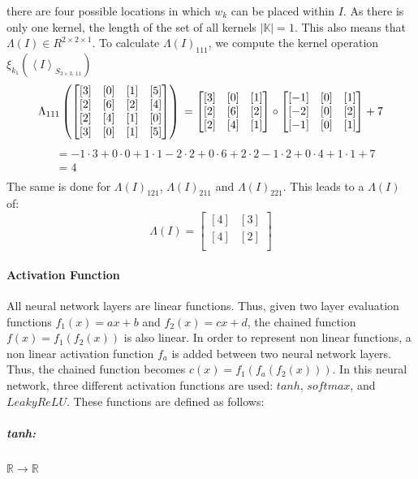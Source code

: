 \documentclass[12pt]{article}
\begin{document}
there are four possible locations in which \(w_k\) can be placed within \(I\). As there is only one kernel, the length of the set of all kernels \(|\mathbb{K}| = 1\). This also means that \(\Lambda(I) \in R^{2 \times 2 \times 1}\). To calculate \(\Lambda(I)_{111}\), we compute the kernel operation \(\xi_{k_1}(\left<I\right>_{S_{3\times 3,\,11}})\)
\begin{equation}
\label{eq:conv:eg}
\Lambda_{111}
\left(\begin{bmatrix}
[3] & [0] & [1] & [5] \\
[2] & [6] & [2] & [4] \\
[2] & [4] & [1] & [0] \\
[3] & [0] & [1] & [5] \\
\end{bmatrix}\right)\\
 = \begin{bmatrix}
[3] & [0] & [1] \\
[2] & [6] & [2] \\
[2] & [4] & [1] \\
\end{bmatrix} \circ 
\begin{bmatrix}
[-1] & [0] & [1] \\
[-2] & [0] & [2] \\
[-1] & [0] & [1]
\end{bmatrix} + 7
\end{equation}
\begin{align*}
&= -1 \cdot 3 + 0 \cdot 0 + 1 \cdot 1 - 2 \cdot 2 + 0 \cdot 6 + 2 \cdot 2 -1 \cdot 2 + 0 \cdot 4 + 1 \cdot 1 + 7\\
&= 4\\
\end{align*}
The same is done for \(\Lambda(I)_{121}\), \(\Lambda(I)_{211}\) and \(\Lambda(I)_{221}\). This leads to a \(\Lambda(I)\) of:
\[
\Lambda(I) = \begin{bmatrix}
[4] & [3] \\
[4] & [2] \\
\end{bmatrix}
\]
\paragraph{Activation Function}
All neural network layers are linear functions. Thus, given two layer evaluation functions \(f_1(x) = ax + b\) and \(f_2(x) = cx + d\), the chained function \(f(x) = f_1(f_2(x))\) is also linear.
In order to represent non linear functions, a non linear activation function \(f_a\) is added between two neural network layers. Thus, the chained function becomes \(c(x) = f_1(f_a(f_2(x)))\). In this neural network, three different activation functions are used: \(tanh\), \(softmax\), and \(LeakyReLU\). These functions are defined as follows:
\subparagraph*{tanh:}\(\mathbb{R}\to \mathbb{R}\)
\end{document}
